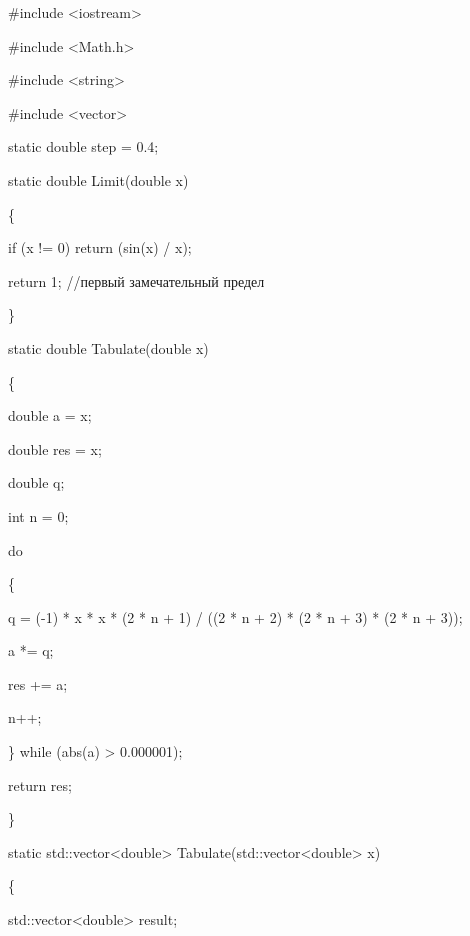 \documentclass[12pt,a4paper]{report}
\begin{document}
	\#include <iostream>
	
	\#include <Math.h>
	
	\#include <string>
	
	\#include <vector>
	\newline 
	
	static double step = 0.4;
	
	static double Limit(double x)
	
    \{
    
		\hspace{1cm}if (x != 0) return (sin(x) / x);
		
		\hspace{1cm}return 1; //первый замечательный предел
		
	\}\newline 
	
	static double Tabulate(double x)
	
	\{
	
		\hspace{1cm}double a = x;
	
		\hspace{1cm}double res = x;
	
		\hspace{1cm}double q;
	
		\hspace{1cm}int n = 0;
	
		\hspace{1cm}do
	
		\hspace{1cm}\{
		
			\hspace{2cm}q = (-1) * x * x * (2 * n + 1) / ((2 * n + 2) * (2 * n + 3) * (2 * n + 3));
		
			\hspace{2cm}a *= q;
		
			\hspace{2cm}res += a;
		
			\hspace{2cm}n++;
		
		\hspace{1cm}\} while (abs(a) > 0.000001);
		
		\hspace{1cm}return res;
	
	\}
	
	static std::vector<double> Tabulate(std::vector<double> x)
	
	\{
	
		\hspace{1cm}std::vector<double> result;
	
\end{document}
